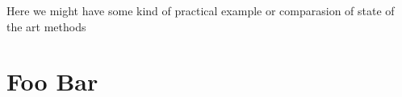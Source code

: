 
Here we might have some kind of practical example or comparasion of state of
the art methods


\section{Foo Bar}
